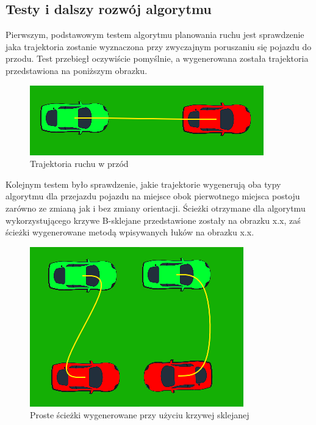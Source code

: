 \documentclass[a4paper,11pt,twoside]{report}
\theoremstyle{definition}
\begin{document}
\subsection{Testy i dalszy rozwój algorytmu}

Pierwszym, podstawowym testem algorytmu planowania ruchu jest sprawdzenie jaka trajektoria zostanie wyznaczona przy zwyczajnym poruszaniu się pojazdu do przodu. Test przebiegł oczywiście pomyślnie, a wygenerowana została trajektoria przedstawiona na poniższym obrazku.

\begin{figure}[h!]
\centering
\includegraphics[scale=0.9]{simplePath0}
\caption[Trajektoria ruchu w przód]{Trajektoria ruchu w przód}
\end{figure}

Kolejnym testem było sprawdzenie, jakie trajektorie wygenerują oba typy algorytmu dla przejazdu pojazdu na miejsce obok pierwotnego miejsca postoju zarówno ze zmianą jak i bez zmiany orientacji. Ścieżki otrzymane dla algorytmu wykorzystującego krzywe B-sklejane przedstawione zostały na obrazku x.x, zaś ścieżki wygenerowane metodą wpisywanych łuków na obrazku x.x.

\begin{figure}[h!]
\centering
\includegraphics[scale=0.9]{simplePath1}
\caption[Proste ścieżki wygenerowane przy użyciu krzywej sklejanej]{Proste ścieżki wygenerowane przy użyciu krzywej sklejanej}
\end{figure}
\end{document}
